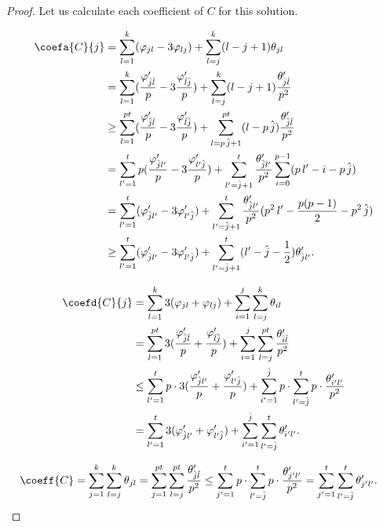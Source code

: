 \begin{proof}
Let us calculate each coefficient of $C$ for this solution.

\begin{align*}
 \coefa{C}{j} &=   \sum_{l=1}^{k} (\varphi_{jl} - 3 \varphi_{lj})
                 + \sum_{l=j}^{k} (l - j + 1) \theta_{jl} \\
              &=   \sum_{l=1}^{k} (\frac{\varphi'_{\hat{j}\hat{l}}}{p} - 3 \frac{\varphi'_{\hat{l}\hat{j}}}{p})
                 + \sum_{l=j}^{k} (l - j + 1) \frac{\theta'_{\hat{j}\hat{l}}}{p^2} \\
              &\ge \sum_{l=1}^{pt} (\frac{\varphi'_{\hat{j}\hat{l}}}{p} - 3 \frac{\varphi'_{\hat{l}\hat{j}}}{p})
                 + \sum_{l=p\,\hat{j} + 1}^{pt} (l - p\,\hat{j}) \frac{\theta'_{\hat{j}\hat{l}}}{p^2} \\
              &=   \sum_{l'=1}^{t} p (\frac{\varphi'_{\hat{j}l'}}{p} - 3 \frac{\varphi'_{l'\hat{j}}}{p})
                 + \sum_{l'=\hat{j} + 1}^{t} \frac{\theta'_{\hat{j}l'}}{p^2} \sum_{i = 0}^{p - 1} (p\,l' - i - p\,\hat{j}) \\
              &=   \sum_{l'=1}^{t} (\varphi'_{\hat{j}l'} - 3 \varphi'_{l'\hat{j}})
                 + \sum_{l'=\hat{j} + 1}^{t} \frac{\theta'_{\hat{j}l'}}{p^2} (p^2\,l' - \frac{p(p-1)}{2} - p^2\,\hat{j}) \\
              &\ge \sum_{l'=1}^{t} (\varphi'_{\hat{j}l'} - 3 \varphi'_{l'\hat{j}})
                 + \sum_{l'=\hat{j} + 1}^{t} (l' - \hat{j} - \frac{1}{2}) \theta'_{\hat{j}l'}.
\end{align*}

\begin{align*}
 \coefd{C}{j} &= \sum_{l=1}^{k} 3 (\varphi_{jl} + \varphi_{lj})
               + \sum_{i=1}^{j} \sum_{l = j}^{k} \theta_{il} \\
              &= \sum_{l=1}^{pt} 3 (\frac{\varphi'_{\hat{j} \hat{l}}}{p} + \frac{\varphi'_{\hat{l} \hat{j}}}{p})
               + \sum_{i=1}^{j} \sum_{l = j}^{pt} \frac{\theta'_{\hat{i}\hat{l}}}{p^2} \\
              &\le \sum_{l'=1}^{t} p \cdot 3 (\frac{\varphi'_{\hat{j} l'}}{p} + \frac{\varphi'_{l' \hat{j}}}{p})
               + \sum_{i'=1}^{\hat{j}} p \cdot \sum_{l' = \hat{j}}^{t} p \cdot \frac{\theta'_{i'l'}}{p^2} \\
              &= \sum_{l'=1}^{t} 3 (\varphi'_{\hat{j} l'} + \varphi'_{l' \hat{j}})
               + \sum_{i'=1}^{\hat{j}} \sum_{l' = \hat{j}}^{t} \theta'_{i'l'}.
\end{align*}

\begin{align*}
 \coeff{C}    &=    \sum_{j=1}^{k} \sum_{l= j}^{k} \theta_{jl}
               =    \sum_{j=1}^{pt} \sum_{l = j}^{pt} \frac{\theta'_{\hat{j}\hat{l}}}{p^2}
               \le  \sum_{j'=1}^{t} p \cdot \sum_{l'=\hat{j}}^{t} p \cdot \frac{\theta'_{j'l'}}{p^2}
               =    \sum_{j'=1}^{t} \sum_{l' = \hat{j}}^{t} \theta'_{j'l'}.
\end{align*}


\end{proof}
